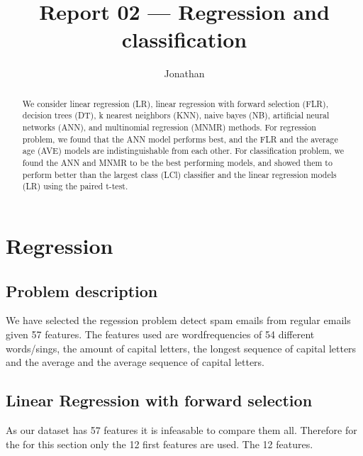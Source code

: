 \documentclass[10pt, paper=a4]{article}
\begin{document}
\title{Report 02 --- Regression and classification}

\author{Jonathan}

\date{}

\maketitle

\begin{abstract}
We consider linear regression (LR), linear regression with forward
selection (FLR), decision trees (DT), k nearest neighbors (KNN), naive
bayes (NB), artificial neural networks (ANN), and multinomial
regression (MNMR) methods. For regression problem, we found that the
ANN model performs best, and the FLR and the average age (AVE) models
are indistinguishable from each other. For classification problem, we
found the ANN and MNMR to be the best performing models, and showed
them to perform better than the largest class (LCl) classifier and the
linear regression models (LR) using the paired t-test.
\end{abstract}

\section{Regression}
\label{sec:regression}

\subsection{Problem description}
We have selected the regession problem detect spam emails from regular
emails given 57 features.  The features used are wordfrequencies of 54
different words/sings, the amount of capital letters, the longest
sequence of capital letters and the average and the average sequence
of capital letters.

\subsection{Linear Regression with forward selection}
As our dataset has 57 features it is infeasable to compare them all.
Therefore for the for this section only the 12 first features are used.
The 12 features.
\end{document}
